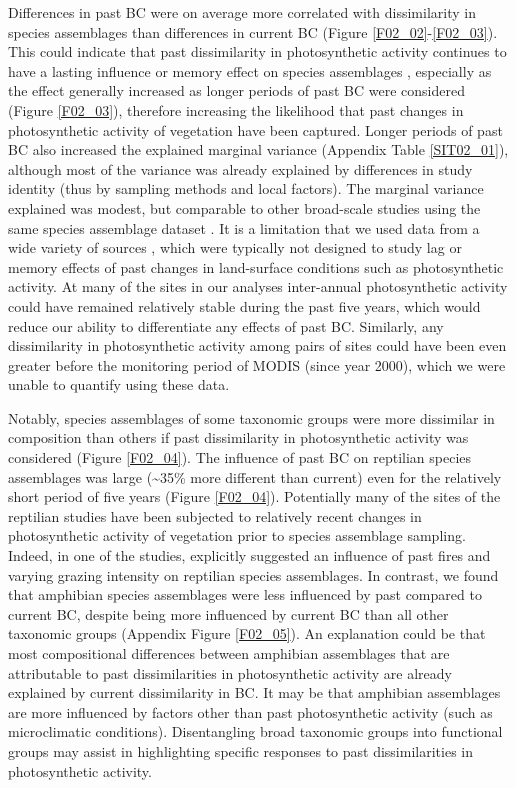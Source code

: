 Differences in past BC were on average more correlated with dissimilarity in species assemblages than differences in current BC (Figure \ref{F02_02}-\ref{F02_03}). This could indicate that past dissimilarity in photosynthetic activity continues to have a lasting influence or memory effect on species assemblages \citep{Ogle2015}, especially as the effect generally increased as longer periods of past BC were considered (Figure \ref{F02_03}), therefore increasing the likelihood that past changes in photosynthetic activity of vegetation have been captured. Longer periods of past BC also increased the explained marginal variance (Appendix Table \ref{SIT02_01}), although most of the variance was already explained by differences in study identity (thus by sampling methods and local factors). The marginal variance explained was modest, but comparable to other broad-scale studies using the same species assemblage dataset \citep{Newbold2014b,DePalma2015,Jung2016}. It is a limitation that we used data from a wide variety of sources \citep{Hudson2016}, which were typically not designed to study lag or memory effects of past changes in land-surface conditions such as photosynthetic activity. At many of the sites in our analyses inter-annual photosynthetic activity could have remained relatively stable during the past five years, which would reduce our ability to differentiate any effects of past BC. Similarly, any dissimilarity in photosynthetic activity among pairs of sites could have been even greater before the monitoring period of MODIS (since year 2000), which we were unable to quantify using these data. 

Notably, species assemblages of some taxonomic groups were more dissimilar in composition than others if past dissimilarity in photosynthetic activity was considered (Figure \ref{F02_04}). The influence of past BC on reptilian species assemblages was large (\textasciitilde35\% more different than current) even for the relatively short period of five years (Figure \ref{F02_04}). Potentially many of the sites of the reptilian studies have been subjected to relatively recent changes in photosynthetic activity of vegetation prior to species assemblage sampling. Indeed, in one of the studies, \cite{Woinarski2009} explicitly suggested an influence of past fires and varying grazing intensity on reptilian species assemblages. In contrast, we found that amphibian species assemblages were less influenced by past compared to current BC, despite being more influenced by current BC than all other taxonomic groups (Appendix Figure \ref{F02_05}). An explanation could be that most compositional differences between amphibian assemblages that are attributable to past dissimilarities in photosynthetic activity are already explained by current dissimilarity in BC. It may be that amphibian assemblages are more influenced by factors other than past photosynthetic activity (such as microclimatic conditions). Disentangling broad taxonomic groups into functional groups may assist in highlighting specific responses to past dissimilarities in photosynthetic activity.

